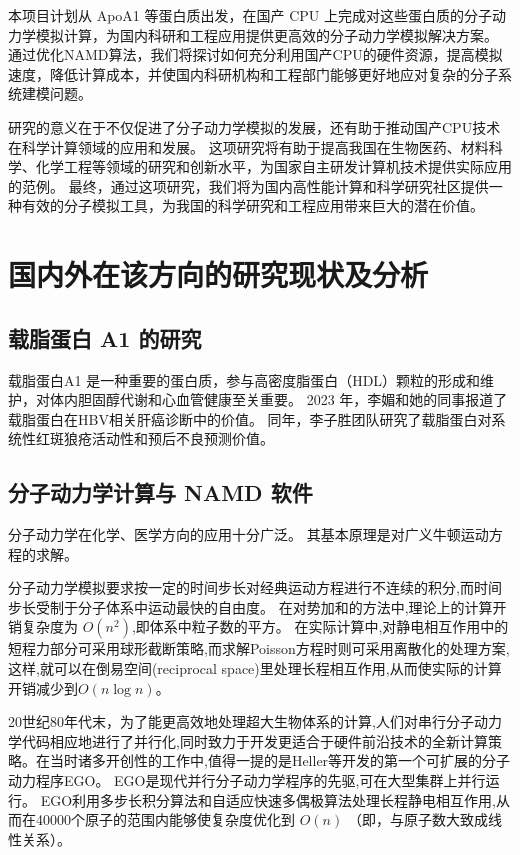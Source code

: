 本项目计划从 ApoA1 等蛋白质出发，在国产 CPU 上完成对这些蛋白质的分子动力学模拟计算，为国内科研和工程应用提供更高效的分子动力学模拟解决方案。
通过优化NAMD算法，我们将探讨如何充分利用国产CPU的硬件资源，提高模拟速度，降低计算成本，并使国内科研机构和工程部门能够更好地应对复杂的分子系统建模问题。

研究的意义在于不仅促进了分子动力学模拟的发展，还有助于推动国产CPU技术在科学计算领域的应用和发展。
这项研究将有助于提高我国在生物医药、材料科学、化学工程等领域的研究和创新水平，为国家自主研发计算机技术提供实际应用的范例。
最终，通过这项研究，我们将为国内高性能计算和科学研究社区提供一种有效的分子模拟工具，为我国的科学研究和工程应用带来巨大的潜在价值。

\section{国内外在该方向的研究现状及分析}

\subsection{载脂蛋白 A1 的研究}

载脂蛋白A1 是一种重要的蛋白质，参与高密度脂蛋白（HDL）颗粒的形成和维护，对体内胆固醇代谢和心血管健康至关重要。
2023 年，李媚和她的同事报道了载脂蛋白在HBV相关肝癌诊断中的价值\cite{limwjxtd}。
同年，李子胜团队研究了载脂蛋白对系统性红斑狼疮活动性和预后不良预测价值\cite{apoayuhz}。

\subsection{分子动力学计算与 NAMD 软件}

分子动力学在化学、医学方向的应用十分广泛。
其基本原理是对广义牛顿运动方程的求解。

分子动力学模拟要求按一定的时间步长对经典运动方程进行不连续的积分,而时间步长受制于分子体系中运动最快的自由度。 在对势加和的方法中,理论上的计算开销复杂度为 $O(n^2)$,即体系中粒子数的平方。
在实际计算中,对静电相互作用中的短程力部分可采用球形截断策略,而求解Poisson方程时则可采用离散化的处理方案,这样,就可以在倒易空间(reciprocal space)里处理长程相互作用,从而使实际的计算开销减少到$O(n\log n)$。

20世纪80年代末，为了能更高效地处理超大生物体系的计算,人们对串行分子动力学代码相应地进行了并行化,同时致力于开发更适合于硬件前沿技术的全新计算策略。在当时诸多开创性的工作中,值得一提的是Heller等\cite{heller1990molecular}开发的第一个可扩展的分子动力程序EGO。
EGO是现代并行分子动力学程序的先驱,可在大型集群上并行运行。
EGO利用多步长积分算法和自适应快速多偶极算法处理长程静电相互作用,从而在40000个原子的范围内能够使复杂度优化到 $O(n)$ （即，与原子数大致成线性关系）。

